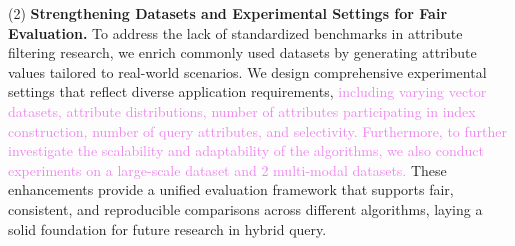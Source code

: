\documentclass[sigconf, nonacm]{acmart}
\begin{document}
	(2) \textbf{Strengthening Datasets and Experimental Settings for Fair Evaluation.}
	To address the lack of standardized benchmarks in attribute filtering research, we enrich commonly used datasets by generating attribute values tailored to real-world scenarios. We design comprehensive experimental settings that reflect diverse application requirements, \textcolor{violet}{including varying vector datasets, attribute distributions, number of attributes participating in index construction, number of query attributes, and selectivity. Furthermore, to further investigate the scalability and adaptability of the algorithms, we also conduct experiments on a large-scale dataset and 2 multi-modal datasets.}  These enhancements provide a unified evaluation framework that supports fair, consistent, and reproducible comparisons across different algorithms, laying a solid foundation for future research in hybrid query.


\end{document}
